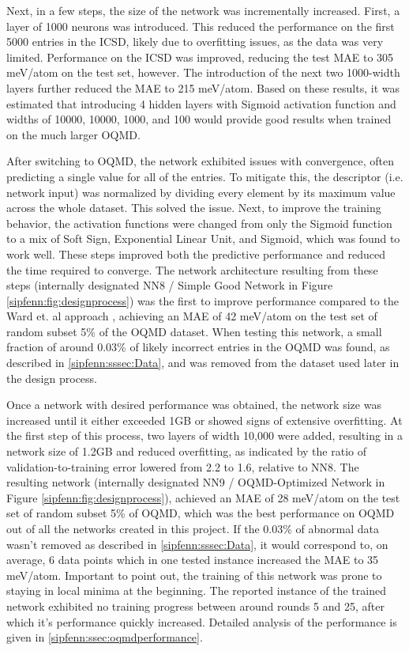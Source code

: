 Next, in a few steps, the size of the network was incrementally increased. First, a layer of 1000 neurons was introduced. This reduced the performance on the first 5000 entries in the ICSD, likely due to overfitting issues, as the data was very limited. Performance on the ICSD was improved, reducing the test MAE to 305 meV/atom on the test set, however. The introduction of the next two 1000-width layers further reduced the MAE to 215 meV/atom. Based on these results, it was estimated that introducing 4 hidden layers with Sigmoid activation function and widths of 10000, 10000, 1000, and 100 would provide good results when trained on the much larger OQMD.

After switching to OQMD, the network exhibited issues with convergence, often predicting a single value for all of the entries. To mitigate this, the descriptor (i.e. network input) was normalized by dividing every element by its maximum value across the whole dataset. This solved the issue. Next, to improve the training behavior, the activation functions were changed from only the Sigmoid function to a mix of Soft Sign, Exponential Linear Unit, and Sigmoid, which was found to work well. These steps improved both the predictive performance and reduced the time required to converge. The network architecture resulting from these steps (internally designated NN8 / Simple Good Network in Figure \ref{sipfenn:fig:designprocess}) was the first to improve performance compared to the Ward et. al approach \cite{Ward2017IncludingTessellations}, achieving an MAE of 42 meV/atom on the test set of random subset 5\% of the OQMD dataset. When testing this network, a small fraction of around 0.03\% of likely incorrect entries in the OQMD was found, as described in \ref{sipfenn:sssec:Data}, and was removed from the dataset used later in the design process.

Once a network with desired performance was obtained, the network size was increased until it either exceeded 1GB or showed signs of extensive overfitting. At the first step of this process, two layers of width 10,000 were added, resulting in a network size of 1.2GB and reduced overfitting, as indicated by the ratio of validation-to-training error lowered from 2.2 to 1.6, relative to NN8. The resulting network (internally designated NN9 / OQMD-Optimized Network in Figure \ref{sipfenn:fig:designprocess}), achieved an MAE of 28 meV/atom on the test set of random subset 5\% of OQMD, which was the best performance on OQMD out of all the networks created in this project. If the 0.03\% of abnormal data wasn't removed as described in \ref{sipfenn:sssec:Data}, it would correspond to, on average, 6 data points which in one tested instance increased the MAE to 35 meV/atom. Important to point out, the training of this network was prone to staying in local minima at the beginning. The reported instance of the trained network exhibited no training progress between around rounds 5 and 25, after which it's performance quickly increased.  Detailed analysis of the performance is given in \ref{sipfenn:ssec:oqmdperformance}.

